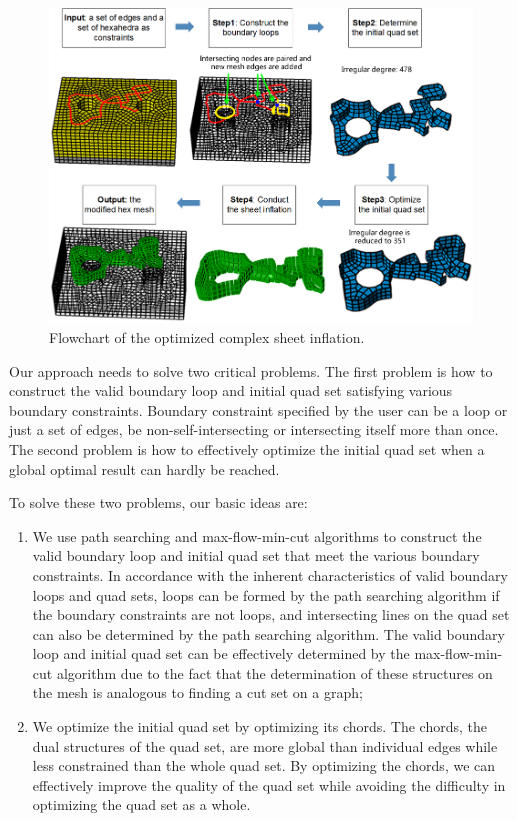 \documentclass[final,5p,times,twocolumn]{elsarticle}
\begin{document}
\begin{figure}[htbp]
\begin{center}
\includegraphics[width=16cm]{overview2.png}
\caption{Flowchart of the optimized complex sheet inflation.}
\label{fig:overview}
\end{center}
\end{figure}

Our approach needs to solve two critical problems. The first problem is how to construct the valid boundary loop and initial quad set satisfying various boundary constraints. Boundary constraint specified by the user can be a loop or just a set of edges, be non-self-intersecting or intersecting itself more than once. The second problem is how to effectively optimize the initial quad set when a global optimal result can hardly be reached.

To solve these two problems, our basic ideas are:
\begin{enumerate}
  \item We use path searching and max-flow-min-cut algorithms to construct the valid boundary loop and initial quad set that meet the various boundary constraints. In accordance with the inherent characteristics of valid boundary loops and quad sets, loops can be formed by the path searching algorithm if the boundary constraints are not loops, and intersecting lines on the quad set can also be determined by the path searching algorithm. The valid boundary loop and initial quad set can be effectively determined by the max-flow-min-cut algorithm due to the fact that the determination of these structures on the mesh is analogous to finding a cut set on a graph;
  \item We optimize the initial quad set by optimizing its chords. The chords, the dual structures of the quad set, are more global than individual edges while less constrained than the whole quad set. By optimizing the chords, we can effectively improve the quality of the quad set while avoiding the difficulty in optimizing the quad set as a whole.
\end{enumerate}
\end{document}
